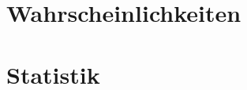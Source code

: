 \documentclass{article}
\begin{document}
\begin{multicols*}{3}
    \raggedright
    \part{Wahrscheinlichkeiten}
    
    
    
    
    \clearpage
    \part{Statistik}
    
    
    
    \clearpage
\end{multicols*}
\end{document}

